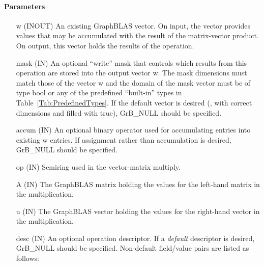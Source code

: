 \paragraph{Parameters}

\begin{itemize}[leftmargin=1.1in]
    \item[{\sf w}]    ({\sf INOUT}) An existing GraphBLAS vector.  On input,
    the vector provides values that may be accumulated with the result of the
    matrix-vector product.  On output, this vector holds the results of the
    operation.

    \item[{\sf mask}] ({\sf IN}) An optional ``write'' mask that controls which
    results from this operation are stored into the output vector {\sf w}. The 
    mask dimensions must match those of the vector {\sf w} and the domain of the
    {\sf mask} vector must be of type {\sf bool} or any of the predefined 
    ``built-in'' types in Table~\ref{Tab:PredefinedTypes}.  If the default
    vector is desired (\ie, with correct dimensions and filled with {\sf true}), 
    {\sf GrB\_NULL} should be specified.

    \item[{\sf accum}] ({\sf IN}) An optional binary operator used for accumulating
    entries into existing {\sf w} entries.
    If assignment rather than accumulation is
    desired, {\sf GrB\_NULL} should be specified.

    \item[{\sf op}]   ({\sf IN}) Semiring used in the vector-matrix
    multiply.

    \item[{\sf A}]    ({\sf IN}) The GraphBLAS matrix holding the values
    for the left-hand matrix in the multiplication.

    \item[{\sf u}]    ({\sf IN}) The GraphBLAS vector holding the values for
    the right-hand vector in the multiplication.

    \item[{\sf desc}] ({\sf IN}) An optional operation descriptor. If
    a \emph{default} descriptor is desired, {\sf GrB\_NULL} should be
    specified. Non-default field/value pairs are listed as follows:  \\


\end{itemize}
